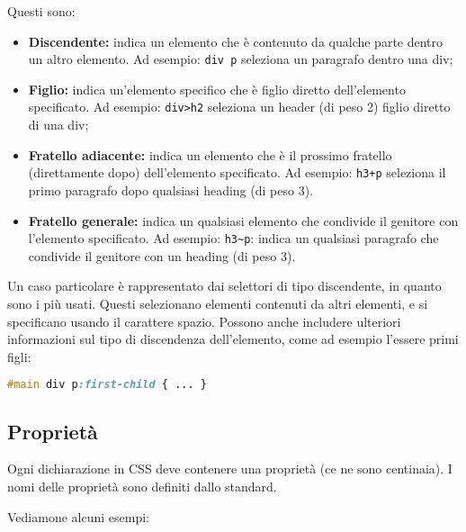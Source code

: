 \documentclass[a4paper,11pt]{article}
\begin{document}
Questi sono:
\begin{itemize}
	\item \textbf{Discendente:} indica un elemento che è contenuto da qualche parte dentro un altro elemento.
		Ad esempio: \lstinline|div p| seleziona un paragrafo dentro una div;
	\item \textbf{Figlio:} indica un'elemento specifico che è figlio diretto dell'elemento specificato.
		Ad esempio: \lstinline|div>h2| seleziona un header (di peso 2) figlio diretto di una div;
	\item \textbf{Fratello adiacente:} indica un elemento che è il prossimo fratello (direttamente dopo) dell'elemento specificato.
		Ad esempio: \lstinline|h3+p| seleziona il primo paragrafo dopo qualsiasi heading (di peso 3).
	\item \textbf{Fratello generale:} indica un qualsiasi elemento che condivide il genitore con l'elemento specificato.
		Ad esempio: \lstinline|h3~p|: indica un qualsiasi paragrafo che condivide il genitore con un heading (di peso 3).
\end{itemize}

Un caso particolare è rappresentato dai selettori di tipo discendente, in quanto sono i più usati.
Questi selezionano elementi contenuti da altri elementi, e si specificano usando il carattere spazio.
Possono anche includere ulteriori informazioni sul tipo di discendenza dell'elemento, come ad esempio l'essere primi figli:
\begin{lstlisting}[language=css, style=codestyle]	
#main div p:first-child { ... }
\end{lstlisting}

\subsection{Proprietà}

Ogni dichiarazione in CSS deve contenere una proprietà (ce ne sono centinaia).
I nomi delle proprietà sono definiti dallo standard.

Vediamone alcuni esempi:
\end{document}

